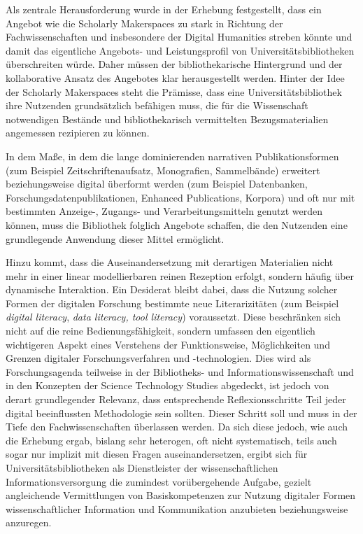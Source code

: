\documentclass[a4paper,
fontsize=11pt,
oneside,
numbers=noperiodatend,
parskip=half-,
bibliography=totoc,
final
]{scrartcl}
\begin{document}
Als zentrale Herausforderung wurde in der Erhebung festgestellt, dass
ein Angebot wie die Scholarly Makerspaces zu stark in Richtung der
Fachwissenschaften und insbesondere der Digital Humanities streben
könnte und damit das eigentliche Angebots- und Leistungsprofil von
Universitätsbibliotheken überschreiten würde. Daher müssen der
bibliothekarische Hintergrund und der kollaborative Ansatz des Angebotes
klar herausgestellt werden. Hinter der Idee der Scholarly Makerspaces
steht die Prämisse, dass eine Universitätsbibliothek ihre Nutzenden
grundsätzlich befähigen muss, die für die Wissenschaft notwendigen
Bestände und bibliothekarisch vermittelten Bezugsmaterialien angemessen
rezipieren zu können.

In dem Maße, in dem die lange dominierenden narrativen
Publikationsformen (zum Beispiel Zeitschriftenaufsatz, Monografien,
Sammelbände) erweitert beziehungsweise digital überformt werden (zum
Beispiel Datenbanken, Forschungsdatenpublikationen, Enhanced
Publications, Korpora) und oft nur mit bestimmten Anzeige-, Zugangs- und
Verarbeitungsmitteln genutzt werden können, muss die Bibliothek folglich
Angebote schaffen, die den Nutzenden eine grundlegende Anwendung dieser
Mittel ermöglicht.

Hinzu kommt, dass die Auseinandersetzung mit derartigen Materialien
nicht mehr in einer linear modellierbaren reinen Rezeption erfolgt,
sondern häufig über dynamische Interaktion. Ein Desiderat bleibt dabei,
dass die Nutzung solcher Formen der digitalen Forschung bestimmte neue
Literarizitäten (zum Beispiel \emph{digital literacy}, \emph{data
literacy, tool literacy}) voraussetzt. Diese beschränken sich nicht auf
die reine Bedienungsfähigkeit, sondern umfassen den eigentlich
wichtigeren Aspekt eines Verstehens der Funktionsweise, Möglichkeiten
und Grenzen digitaler Forschungsverfahren und -technologien. Dies wird
als Forschungsagenda teilweise in der Bibliotheks- und
Informationswissenschaft und in den Konzepten der Science Technology
Studies abgedeckt, ist jedoch von derart grundlegender Relevanz, dass
entsprechende Reflexionsschritte Teil jeder digital beeinflussten
Methodologie sein sollten. Dieser Schritt soll und muss in der Tiefe den
Fachwissenschaften überlassen werden. Da sich diese jedoch, wie auch die
Erhebung ergab, bislang sehr heterogen, oft nicht systematisch, teils
auch sogar nur implizit mit diesen Fragen auseinandersetzen, ergibt sich
für Universitätsbibliotheken als Dienstleister der wissenschaftlichen
Informationsversorgung die zumindest vorübergehende Aufgabe, gezielt
angleichende Vermittlungen von Basiskompetenzen zur Nutzung digitaler
Formen wissenschaftlicher Information und Kommunikation anzubieten
beziehungsweise anzuregen.
\end{document}
